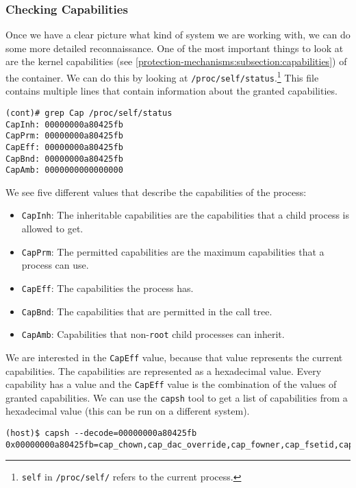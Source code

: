 \subsubsection{Checking Capabilities}\label{subsubsection:container:capabilities}
Once we have a clear picture what kind of system we are working with, we can do some more detailed reconnaissance. One of the most important things to look at are the kernel capabilities (see \autoref{protection-mechanisms:subsection:capabilities}) of the container. We can do this by looking at \lstinline{/proc/self/status}.\footnote{\lstinline{self} in \lstinline{/proc/self/} refers to the current process.} This file contains multiple lines that contain information about the granted capabilities.

\begin{lstlisting}[caption={Capabilities of process in container.},captionpos=b]
(cont)# grep Cap /proc/self/status
CapInh:	00000000a80425fb
CapPrm:	00000000a80425fb
CapEff:	00000000a80425fb
CapBnd:	00000000a80425fb
CapAmb:	0000000000000000
\end{lstlisting}

We see five different values that describe the capabilities of the process:
\begin{itemize}
    \item \lstinline{CapInh}: The inheritable capabilities are the capabilities that a child process is allowed to get.
    \item \lstinline{CapPrm}: The permitted capabilities are the maximum capabilities that a process can use.
    \item \lstinline{CapEff}: The capabilities the process has.
    \item \lstinline{CapBnd}: The capabilities that are permitted in the call tree.
    \item \lstinline{CapAmb}: Capabilities that non-\lstinline{root} child processes can inherit.
\end{itemize}

We are interested in the \lstinline{CapEff} value, because that value represents the current capabilities. The capabilities are represented as a hexadecimal value. Every capability has a value and the \lstinline{CapEff} value is the combination of the values of granted capabilities. We can use the \lstinline{capsh} tool to get a list of capabilities from a hexadecimal value (this can be run on a different system).

\begin{lstlisting}[caption={\lstinline{capsh} shows capabilities.},captionpos=b]
(host)$ capsh --decode=00000000a80425fb
0x00000000a80425fb=cap_chown,cap_dac_override,cap_fowner,cap_fsetid,cap_kill,cap_setgid,cap_setuid,cap_setpcap,cap_net_bind_service,cap_net_raw,cap_sys_chroot,cap_mknod,cap_audit_write,cap_setfcap
\end{lstlisting}

